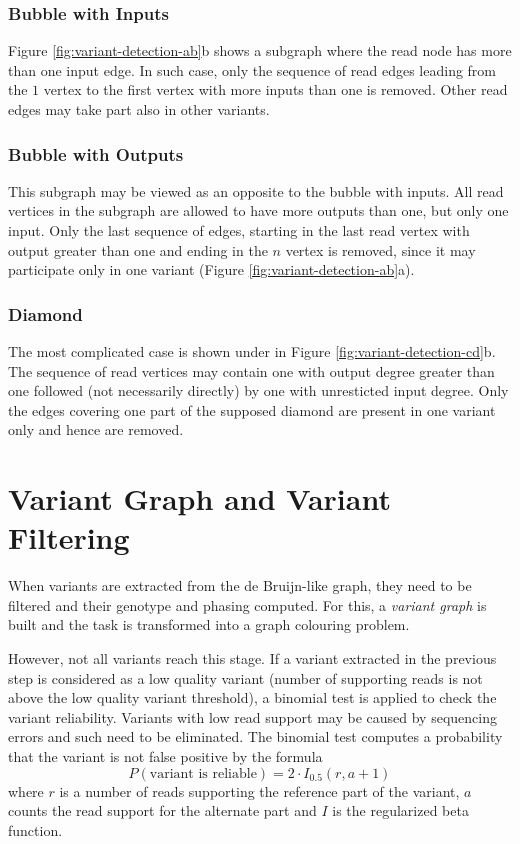 \subsubsection{Bubble with Inputs}
\label{subsec:bubble-with-inputs}

Figure \ref{fig:variant-detection-ab}b shows a subgraph where the read node has more than one input edge. In such case, only the sequence of read edges leading from the $1$ vertex to the first vertex with more inputs than one is removed. Other read edges may take part also in other variants.

\subsubsection{Bubble with Outputs}
\label{subsec:bubble-with-outputs}

This subgraph may be viewed as an opposite to the bubble with inputs. All read vertices in the subgraph are allowed to have more outputs than one, but only one input. Only the last sequence of edges, starting in the last read vertex with output greater than one and ending in the $n$ vertex is removed, since it may participate only in one variant (Figure \ref{fig:variant-detection-ab}a).

\subsubsection{Diamond}
\label{subsec:diamond}

The most complicated case is shown under in Figure \ref{fig:variant-detection-cd}b. The sequence of read vertices may contain one with output degree greater than one followed (not necessarily directly) by one with unresticted input degree. Only the edges covering one part of the supposed diamond are present in one variant only and hence are removed. 

\section{Variant Graph and Variant Filtering}
\label{sec:variant-graph-and-variant-filtering}

When variants are extracted from the de Bruijn-like graph, they need to be filtered and their genotype and phasing computed. For this, a \textit{variant graph} is built and the task is transformed into a graph colouring problem.

However, not all variants reach this stage. If a variant extracted in the previous step is considered as a low quality variant (number of supporting reads is not above the low quality variant threshold), a binomial test is applied to check the variant reliability. Variants with low read support may be caused by sequencing errors and such need to be eliminated. The binomial test computes a probability that the variant is not false positive by the formula
$$
P(\text{variant is reliable}) = 2 \cdot I_{0.5} (r, a + 1)
$$
where $r$ is a number of reads supporting the reference part of the variant, $a$ counts the read support for the alternate part and $I$ is the regularized beta function. 

